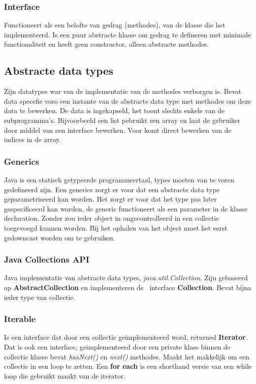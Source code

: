 \subsubsection{Interface}
Functioneert als een belofte van gedrag (methodes), van de klasse die het implementeerd.
Is een puur abstracte klasse om gedrag te defineren met minimale functionaliteit en heeft geen constructor, alleen abstracte methodes.

\subsection{Abstracte data types}
Zijn datatypes war van de implementatie van de methodes verborgen is.
Bevat data specefie voro een instante van de abstracte data type met methodes om deze data te bewerken.
De data is ingekapseld, het toont slechts enkele van de subprogramma's.
Bijvoorbeeld een list pebruikt een array en laat de gebruiker door middel van een interface bewerken.
Voor komt direct bewerken van de indices in de array.

\subsubsection{Generics}
Java is een statisch getypeerde programmeertaal, types moeten van te voren gedefineerd zijn.
Een generics zorgt er voor dat een abstracte data type geparametriseerd kan worden.
Het zorgt er voor dat het type pas later gespecificeerd kan worden, de generic functioneert als een parameter in de klasse declaration.
Zonder zou ieder object in ongecontrolleerd in een collectie toegevoegd kunnen worden.
Bij het ophalen van het object moet het eerst gedowncast worden om te gebruiken.

\subsubsection{Java Collections API}
Java implementatie van abstracte data types, \textit{java.util.Collection}.
Zijn gebaseerd op \textbf{AbstractCollection} en implementeren de \ interface \textbf{Collection}.
Bevat bijna ieder type van collectie.

\subsubsection{Iterable}
Is een interface dat door een collectie geimplementeerd word, returned \textbf{Iterator}.
Dat is ook een interface, geimplementeerd door een private klass binnen de collectie klasse bevat \textit{hasNext()} en \textit{next()} methodes.
Maakt het makkelijk om een collectie in een loop te zetten.
Een \textbf{for each} is een shorthand versie van een while loop die gebruikt maakt van de iterator.

